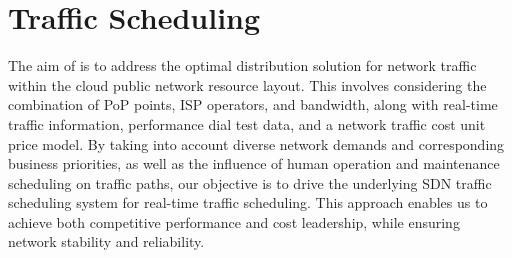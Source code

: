 \section{Traffic Scheduling} \label{sec:te}
\label{sec:scheduling}




The aim of {\sys} is to address the optimal distribution solution for network traffic within the cloud public network resource layout. This involves considering the combination of PoP points, ISP operators, and bandwidth, along with real-time traffic information, performance dial test data, and a network traffic cost unit price model. By taking into account diverse network demands and corresponding business priorities, as well as the influence of human operation and maintenance scheduling on traffic paths, our objective is to drive the underlying SDN traffic scheduling system for real-time traffic scheduling. This approach enables us to achieve both competitive performance and cost leadership, while ensuring network stability and reliability.


